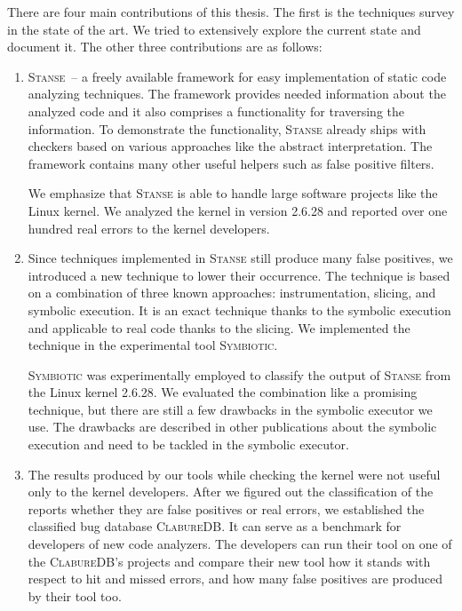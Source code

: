 \documentclass[11pt,a4paper]{book}
\newcommand{\cdb}{\textsc{ClabureDB}\xspace}
\newcommand{\stan}{\textsc{Stanse}\xspace}
\newcommand{\symbio}{\textsc{Symbiotic}\xspace}
\begin{document}
There are four main contributions of this thesis. The first is the techniques
survey in the state of the art. We tried to extensively explore the current
state and document it. The other three contributions are as follows:
\begin{enumerate}
\item \stan\ -- a freely available framework for easy implementation of static
code analyzing techniques.  The framework provides needed information about
the analyzed code and it also comprises a functionality for traversing the
information. To demonstrate the functionality, \stan already ships with
checkers based on various approaches like the abstract interpretation. The
framework contains many other useful helpers such as false positive filters.

We emphasize that \stan is able to handle large software projects like the
Linux kernel. We analyzed the kernel in version 2.6.28 and reported over one
hundred real errors to the kernel developers.

\item Since techniques implemented in \stan still produce many false
positives, we introduced a new technique to lower their occurrence. The
technique is based on a combination of three known approaches:
instrumentation, slicing, and symbolic execution. It is an exact technique
thanks to the symbolic execution and applicable to real code thanks to the
slicing. We implemented the technique in the experimental tool \symbio.

\symbio was experimentally employed to classify the output of \stan from the
Linux kernel 2.6.28. We evaluated the combination like a promising technique,
but there are still a few drawbacks in the symbolic executor we use. The
drawbacks are described in other publications about the symbolic execution and
need to be tackled in the symbolic executor.

\item The results produced by our tools while checking the kernel were not
useful only to the kernel developers. After we figured out the classification
of the reports whether they are false positives or real errors, we established
the classified bug database \cdb. It can serve as a benchmark for developers
of new code analyzers. The developers can run their tool on one of the \cdb's
projects and compare their new tool how it stands with respect to hit and
missed errors, and how many false positives are produced by their tool too.

\end{enumerate}
\end{document}
